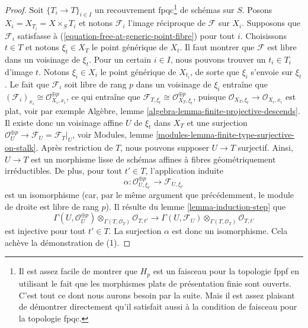 \begin{proof}
Soit $\{T_i \to T\}_{i \in I}$ un recouvrement fpqc\footnote{Il est assez facile de
montrer que $H_p$
est un faisceau pour la topologie fppf en utilisant le fait que les morphismes plats de présentation
finie sont ouverts. C'est tout ce dont nous aurons besoin par la suite. Mais il est assez
plaisant de démontrer directement qu'il satisfait aussi à la condition de faisceau
pour la topologie fpqc.} de schémas sur $S$.
Posons $X_i = X_{T_i} = X \times_S T_i$ et notons $\mathcal{F}_i$
l'image réciproque de $\mathcal{F}$ sur $X_i$. Supposons que $\mathcal{F}_i$ satisfasse à
(\ref{equation-free-at-generic-point-fibre}) pour tout $i$.
Choisissons $t \in T$ et notons $\xi_t \in X_T$ le point générique de $X_t$.
Il faut montrer que $\mathcal{F}$ est libre dans un voisinage de $\xi_t$.
Pour un certain $i \in I$, nous pouvons trouver un $t_i \in T_i$ d'image $t$.
Notons $\xi_i \in X_i$ le point générique de $X_{t_i}$, de sorte que
$\xi_i$ s'envoie sur $\xi_t$. Le fait que $\mathcal{F}_i$ soit libre de rang
$p$ dans un voisinage de $\xi_i$ entraîne que
$(\mathcal{F}_i)_{x_i} \cong \mathcal{O}_{X_i, x_i}^{\oplus p}$,
ce qui entraîne que
$\mathcal{F}_{T, \xi_t} \cong \mathcal{O}_{X_T, \xi_t}^{\oplus p}$,
puisque $\mathcal{O}_{X_T, \xi_t} \to \mathcal{O}_{X_i, x_i}$ est plat, voir
par exemple
Algèbre, lemme \ref{algebra-lemma-finite-projective-descends}.
Il existe donc un voisinage affine $U$ de $\xi_t$ dans $X_T$
et une surjection
$\mathcal{O}_U^{\oplus p} \to \mathcal{F}_U = \mathcal{F}_T|_U$, voir
Modules, lemme \ref{modules-lemma-finite-type-surjective-on-stalk}.
Après restriction de $T$, nous pouvons supposer $U \to T$ surjectif. Ainsi,
$U \to T$ est un morphisme lisse de schémas affines à fibres géométriquement
irréductibles. De plus, pour tout $t' \in T$, l'application induite
$$
\alpha :
\mathcal{O}_{U, \xi_{t'}}^{\oplus p}
\longrightarrow
\mathcal{F}_{U, \xi_{t'}}
$$
est un isomorphisme (car, par le même argument que précédemment, le module de droite
est libre de rang $p$). Il résulte du
lemme \ref{lemma-induction-step}
que
$$
\Gamma(U, \mathcal{O}_U^{\oplus p})
\otimes_{\Gamma(T, \mathcal{O}_T)} \mathcal{O}_{T, t'}
\longrightarrow
\Gamma(U, \mathcal{F}_U)
\otimes_{\Gamma(T, \mathcal{O}_T)} \mathcal{O}_{T, t'}
$$
est injective pour tout $t' \in T$. La surjection $\alpha$ est donc un
isomorphisme. Cela achève la démonstration de (1).


\end{proof}
